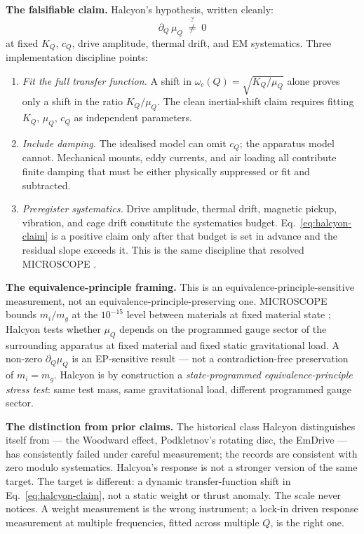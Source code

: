 \documentclass[12pt,a4paper]{article}
\theoremstyle{plain}
\theoremstyle{definition}
\theoremstyle{remark}
\begin{document}
\textbf{The falsifiable claim.} Halcyon's hypothesis, written cleanly:
\begin{equation}
    \partial_{Q}\,\mu_{Q} \;\stackrel{?}{\ne}\; 0
\label{eq:halcyon-claim}
\end{equation}
at fixed $K_{Q}$, $c_{Q}$, drive amplitude, thermal drift, and EM systematics. Three implementation discipline points:

\begin{enumerate}
\item \textit{Fit the full transfer function.} A shift in $\omega_{c}(Q)=\sqrt{K_{Q}/\mu_{Q}}$ alone proves only a shift in the ratio $K_{Q}/\mu_{Q}$. The clean inertial-shift claim requires fitting $K_{Q}$, $\mu_{Q}$, $c_{Q}$ as independent parameters.
\item \textit{Include damping.} The idealised model can omit $c_{Q}$; the apparatus model cannot. Mechanical mounts, eddy currents, and air loading all contribute finite damping that must be either physically suppressed or fit and subtracted.
\item \textit{Preregister systematics.} Drive amplitude, thermal drift, magnetic pickup, vibration, and cage drift constitute the systematics budget. Eq.~\ref{eq:halcyon-claim} is a positive claim only after that budget is set in advance and the residual slope exceeds it. This is the same discipline that resolved MICROSCOPE \cite{microscope2022}.
\end{enumerate}

\textbf{The equivalence-principle framing.} This is an equivalence-principle-sensitive measurement, not an equivalence-principle-preserving one. MICROSCOPE bounds $m_{i}/m_{g}$ at the $10^{-15}$ level between materials at fixed material state \cite{microscope2022}; Halcyon tests whether $\mu_{Q}$ depends on the programmed gauge sector of the surrounding apparatus at fixed material and fixed static gravitational load. A non-zero $\partial_{Q}\mu_{Q}$ is an EP-sensitive result --- not a contradiction-free preservation of $m_{i}=m_{g}$. Halcyon is by construction a \emph{state-programmed equivalence-principle stress test}: same test mass, same gravitational load, different programmed gauge sector.

\textbf{The distinction from prior claims.} The historical class Halcyon distinguishes itself from --- the Woodward effect, Podkletnov's rotating disc, the EmDrive --- has consistently failed under careful measurement; the records are consistent with zero modulo systematics. Halcyon's response is not a stronger version of the same target. The target is different: a dynamic transfer-function shift in Eq.~\ref{eq:halcyon-claim}, not a static weight or thrust anomaly. The scale never notices. A weight measurement is the wrong instrument; a lock-in driven response measurement at multiple frequencies, fitted across multiple $Q$, is the right one.
\end{document}

